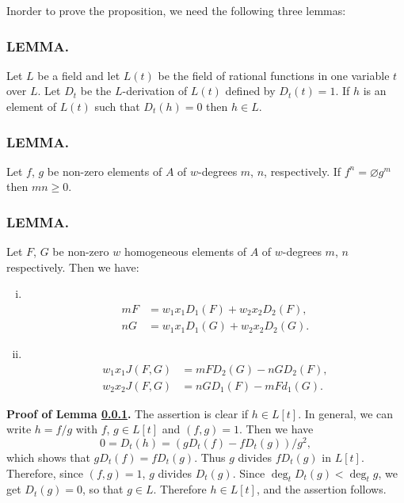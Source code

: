 In\pageoriginale order to prove the proposition, we need the following
three lemmas:

\setcounter{mysubsection}{14}
\subsubsection{\textbf{LEMMA.}} \label{part2:chap6:sec17:sss17.4.1}

Let $L$ be a field and let $L(t)$ be
the field of rational functions in one variable $t$ over $L$. Let
$D_t$ be the $L$-derivation of $L(t)$ defined by $D_t(t)=1$. If $h$ is
an element of $L(t)$ such that $D_t(h)=0$ then $h \in L$.

\subsubsection{\textbf{LEMMA.}} \label{part2:chap6:sec17:sss17.4.2}

Let $f$, $g$ be non-zero elements of $A$ of $w$-degrees $m$, $n$,
respectively. If $f^n = \diameter g^m$ then $mn \geq 0$. 

\subsubsection{\textbf{LEMMA.}} \label{part2:chap6:sec17:sss17.4.3}

Let $F$, $G$ be non-zero $w$ homogeneous elements of $A$ of
$w$-degrees $m$, $n$ respectively. Then we have:
\begin{enumerate}[(i)]
\item ~
\vskip -1.5cm
\begin{align*}
  mF & = w_1 x_1 D_1 (F) + w_2 x_2 D_2 (F),\\
  nG & = w_1 x_1 D_1 (G) + w_2 x_2 D_2 (G).
\end{align*}
\item ~
\vskip -1.5cm
\begin{align*}
  w_1 x_1 J(F, G) & = m F D_2 (G) - nG D_2 (F),\\
  w_2 x_2 J(F, G) & = nG D_1 (F) - mF d_1 (G).
\end{align*}
\end{enumerate}

\medskip
\noindent\textbf{Proof of Lemma \ref{part2:chap6:sec17:sss17.4.1}.}
The assertion is clear if $h \in L [t]$. In general, we can write $h=
f/g$ with $f$, $g \in L [t]$ and \gcd $(f, g)=1$. Then we have
$$
0 = D_t (h) = (g D_t (f) - fD_t (g))/g^2,
$$ 
which shows that $g D_t (f) = fD_t (g)$. Thus $g$ divides $fD_t (g)$
in $L[t]$. Therefore, since \gcd $(f, g)=1$, $g$ divides $D_t
(g)$. Since $\deg_t D_t (g) < \deg_t g$, we get $D_t (g) =0$, so that
$g \in L$. Therefore $h \in L [t]$, and the assertion follows.

